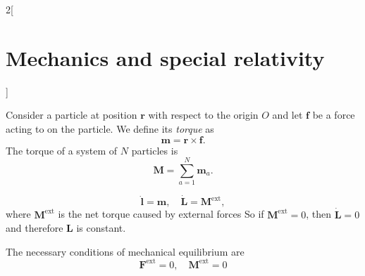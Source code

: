 \documentclass[class=article,10pt,crop=false]{standalone}
\begin{document}
\begin{multicols}{2}[\section{Mechanics and special relativity}]
\begin{concept}
\end{concept}
\begin{concept}[Torque]
Consider a particle at position $\boldsymbol{r}$ with respect to the origin $O$ and let $\boldsymbol{f}$ be a force acting to on the particle. We define its \textit{torque} as $$\boldsymbol{m}=\boldsymbol{r}\times\boldsymbol{f}.$$ The torque of a system of $N$ particles is $$\boldsymbol{M}=\sum_{a=1}^N\boldsymbol{m}_a.$$
\end{concept}
\begin{concept}
$$\dot{\boldsymbol{l}}=\boldsymbol{m},\quad\dot{\boldsymbol{L}}=\boldsymbol{M}^\text{ext},$$where $\boldsymbol{M}^\text{ext}$ is the net torque caused by external forces So if $\boldsymbol{M}^\text{ext}=0$, then $\dot{\boldsymbol{L}}=0$ and therefore $\boldsymbol{L}$ is constant.
\end{concept}
\begin{concept}
The necessary conditions of mechanical equilibrium are $$\boldsymbol{F}^\text{ext}=0,\quad\boldsymbol{M}^\text{ext}=0$$
\end{concept}

\end{multicols}
\end{document}
